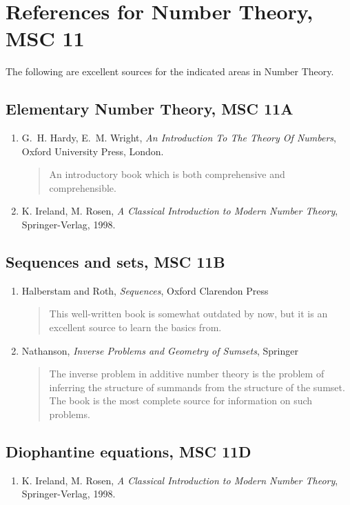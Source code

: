 \documentclass[12pt]{article}
\begin{document}
\section*{References for Number Theory, MSC 11}
The following are excellent sources for the indicated areas in Number Theory.

\subsection*{Elementary Number Theory, MSC 11A}
\begin{enumerate}
\item G.~H. Hardy, E.~M. Wright, {\em An Introduction To The Theory Of Numbers}, Oxford University Press, London.
\begin{quote}
An introductory book which is both comprehensive and comprehensible.
\end{quote}
\item K. Ireland, M. Rosen, {\em A Classical Introduction to Modern Number Theory}, Springer-Verlag, 1998.
\end{enumerate}

\subsection*{Sequences and sets, MSC 11B}
\begin{enumerate}
\item Halberstam and Roth, {\em Sequences}, Oxford Clarendon Press
\begin{quote}
This well-written book is somewhat outdated by now, but it is an excellent source to learn the basics from.
\end{quote}
\item Nathanson, {\em Inverse Problems and Geometry of Sumsets}, Springer
\begin{quote}
The inverse problem in additive number theory is the problem of inferring the structure of summands from the structure of the sumset. The book is the most complete source for information on such problems.
\end{quote}
\end{enumerate}

\subsection*{Diophantine equations, MSC 11D}
\begin{enumerate}
\item K. Ireland, M. Rosen, {\em A Classical Introduction to Modern Number Theory}, Springer-Verlag, 1998.
\end{enumerate}
\end{document}
